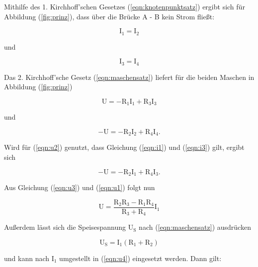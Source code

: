 \newpage \noindent
Mithilfe des 1. Kirchhoff'schen Gesetzes (\ref{eqn:knotenpunktsatz}) ergibt sich für Abbildung (\ref{fig:prinz}), dass über die Brücke A - B kein Strom fließt:

\begin{equation}
\text{I}_1=\text{I}_2 
\label{eqn:i1}
\end{equation}

\noindent
und

\begin{equation}
\text{I}_3=\text{I}_4 
\label{eqn:i3}
\end{equation}

\noindent
Das 2. Kirchhoff'sche Gesetz (\ref{eqn:maschensatz}) liefert für die beiden Maschen in Abbildung (\ref{fig:prinz})

\begin{equation}
\text{U} = -\text{R}_1 \text{I}_1 + \text{R}_3 \text{I}_3
\label{eqn:u1}
\end{equation}

\noindent
und

\begin{equation}
-\text{U} = -\text{R}_2 \text{I}_2 + \text{R}_4 \text{I}_4  .
\label{eqn:u2}
\end{equation}

\noindent
Wird für (\ref{eqn:u2}) genutzt, dass Gleichung (\ref{eqn:i1}) und (\ref{eqn:i3}) gilt, ergibt sich

\begin{equation}
-\text{U} = -\text{R}_2 \text{I}_1 + \text{R}_4 \text{I}_3  .
\label{eqn:u3}
\end{equation}

\noindent
Aus Gleichung (\ref{eqn:u3}) und (\ref{eqn:u1}) folgt nun

\begin{equation}
\text{U} = \frac{\text{R}_2 \text{R}_3 - \text{R}_1 \text{R}_4}{\text{R}_3 + \text{R}_4} \text{I}_1
\label{eqn:u4}
\end{equation}

\noindent
Außerdem lässt sich die Speisespannung $\text{U}_\text{S}$ nach (\ref{eqn:maschensatz}) ausdrücken

\begin{equation}
\text{U}_\text{S} = \text{I}_1 (\text{R}_1 + \text{R}_2) 
\label{eqn:us}
\end{equation}

\noindent
und kann nach $\text{I}_1$ umgestellt in (\ref{eqn:u4}) eingesetzt werden. 
Dann gilt:

